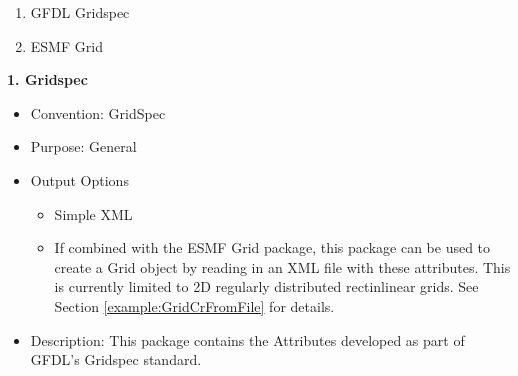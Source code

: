 \begin{enumerate}
    \item GFDL Gridspec
    \item ESMF Grid
\end{enumerate}



\vspace{.20in}
{\bf 1. Gridspec}

\label{CIMGridAttributePackage}

\begin{itemize}
    \item Convention: GridSpec
    \item Purpose: General
    \item Output Options
    \begin{itemize}
        \item Simple XML
        \item If combined with the ESMF Grid package, this package can be used to create a Grid object by reading in an XML file with these attributes. This is currently limited to 2D regularly distributed rectinlinear grids. See Section \ref{example:GridCrFromFile} for details. 
    \end{itemize}
    \item Description: This package contains the Attributes developed as part of GFDL's Gridspec standard.
\end{itemize}

